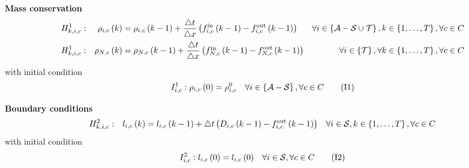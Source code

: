 \noindent \textbf{Mass conservation}
\begin{subequations}
\begin{align}
H^{1}_{k, i, c}: && \rho_{i,c}\left(k\right) & =\rho_{i,c}\left(k-1\right)+\frac{\triangle t}{\triangle x}\left(f_{i,c}^{\text{in}}\left(k-1\right)-f_{i,c}^{\text{out}}\left(k-1\right)\right) & \forall i\in\left\{{\cal A} - {\cal S} \cup {\cal T} \right\} ,k\in\left\{ 1,\ldots,T\right\}, \forall c\in C
\label{eq:conservationGeneral}
\\
H^{1}_{k, i, c}: && \rho_{N,c}\left(k\right) & =\rho_{N,c}\left(k-1\right)+\frac{\triangle t}{\triangle x}\left(\mbox{\ensuremath{f_{N,c}^{\text{in}}\left(k-1\right)}}-f_{N,c}^{\text{out}}\left(k-1\right)\right) & \forall i\in\left\{{\cal T} \right\}, \forall k\in\left\{ 1,\ldots,T\right\}, \forall c\in C
\label{eq:conservationSink}
\end{align}
\label{eq:conservation}
\end{subequations}
with initial condition 
\begin{align}
I^{1}_{i, c} : \rho_{i,c}\left(0\right) =\rho_{i,c}^{0} && \forall i\in\left\{{\cal A} - {\cal S} \right\}, \forall c\in C
\tag{I1}
\label{eq:densityInit}
\end{align}

\noindent \textbf{Boundary conditions}
\begin{align}
H^{2}_{k, i, c}: && l_{i,c}\left(k\right) & =l_{i,c}\left(k-1\right)+\triangle t\left(D_{{i},{c}}\left(k-1\right)-f_{i,c}^{\text{out}}\left(k-1\right)\right) & \forall i\in{\cal S} ,k\in\left\{ 1,\ldots,T\right\}, \forall c\in C
\label{eq:sourceConservation}
\end{align}
with initial condition
\begin{align}
I^{2}_{i, c}: l_{i,c}\left(0\right) & =l_{i,c}\left(0\right) & \forall i\in{\cal S}, \forall c\in C
\tag{I2}\label{eq:sourceInit}
\end{align}


